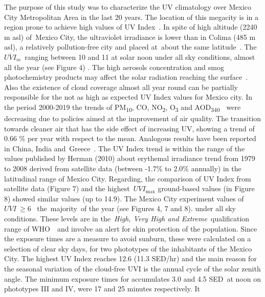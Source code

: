 \documentclass{article}
\begin{document}
{The purpose of this study was to characterize the UV climatology over
Mexico City Metropolitan Area in the last 20 years. The location of this
megacity is in a region prone to achieve high values of UV
Index~\cite{Tanskanen_2006,Zaratti_2014}. In spite of high altitude (2240 m asl)
of~Mexico City, the ultraviolet irradiance is lower than in Colima (485
m asl), a relatively pollution-free city and placed at~about the same
latitude~\cite{Galindo_1995}. The~\(\overline{UVI}_m\)~ranging between 10
and 11 at solar noon under all sky conditions, almost all the year (see
Figure 4)%
. The high aerosols concentration
and smog photochemistry products may affect the solar radiation reaching
the surface~\cite{Castro_2001,Palancar_2012}. Also the existence of cloud coverage
almost all year round can be partially responsible for the not as high
as expected UV Index values for Mexico city. In the period 2000-2019 the
trends of PM\textsubscript{10}, CO, NO\textsubscript{2},
O\textsubscript{3} and AOD\textsubscript{340~}~were decreasing due to
policies aimed at the improvement of air quality. The transition towards
cleaner air that has the side effect of increasing UV, showing a trend
of 0.66 \% per year with respect to the mean. Analogous results have
been reported in China, India and~Greece~\cite{Peng_2014,Wang_2014,Panicker_2014,Raptis_2020}. The UV
Index trend is within the range of the values published by Herman (2010)
about erythemal irradiance trend from 1979 to 2008 derived from
satellite data (between -1.7\% to 2.0\% annually) in the latitudinal
range of Mexico City. Regarding, the comparison of UV Index from
satellite data (Figure 7) and the
highest~\(UVI_{\max}\) ground-based values (in
Figure 8) showed similar values (up to
14.9). The Mexico City experiment values of~\(\overline{UVI}\ \ge6\)~
the~majority~of the year
(see Figures 4, 7 and 8). 
under all sky conditions. These
levels are in the\emph{~High, Very High and Extreme~}qualification range
of WHO~\cite{2002}~and involve an alert for skin protection of
the population. Since the exposure times are a measure to avoid sunburn,
these were calculated on a selection of clear sky days, for two
phototypes of the inhabitants of the Mexico City. The highest UV Index
reaches 12.6 (11.3 SED/hr) and the main reason for the seasonal
variation of the cloud-free UVI is the annual cycle of the solar zenith
angle. The minimum exposure times for accumulates 3.0 and 4.5 SED~at
noon on phototypes III and IV, were 17 and 25 minutes respectively. It
}
\end{document}
